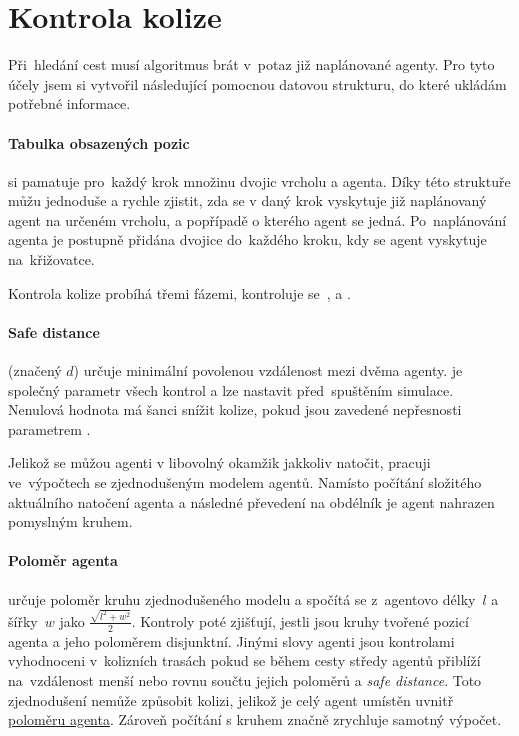 \section{Kontrola kolize}\label{sec:kolize}


Při~hledání cest musí algoritmus brát v~potaz již naplánované agenty.
Pro tyto účely jsem si vytvořil následující pomocnou datovou strukturu, do které ukládám potřebné informace.

\paragraph{Tabulka obsazených pozic}\label{par:obsazene_pozice} si pamatuje pro~každý krok množinu dvojic vrcholu a agenta.
Díky této struktuře můžu jednoduše a rychle zjistit,
zda se v daný krok vyskytuje již naplánovaný agent na určeném vrcholu, a popřípadě o kterého agent se jedná.
Po~naplánování agenta je postupně přidána dvojice do~každého kroku, kdy se agent vyskytuje na~křižovatce.

Kontrola kolize probíhá třemi fázemi, kontroluje se~,
 a .

\paragraph{Safe distance}\label{par:safe_distance} (značený $d$) určuje minimální povolenou vzdálenost mezi dvěma agenty.
 je společný parametr všech kontrol a lze nastavit před~spuštěním simulace.
Nenulová hodnota  má šanci snížit kolize,
pokud jsou zavedené nepřesnosti parametrem .

Jelikož se můžou agenti v libovolný okamžik jakkoliv natočit, pracuji ve~výpočtech se zjednodušeným modelem agentů.
Namísto počítání složitého aktuálního natočení agenta a následné převedení na obdélník je agent nahrazen pomyslným kruhem.

\paragraph{Poloměr agenta}\label{par:polomer_agenta} určuje poloměr kruhu zjednodušeného modelu
a spočítá se z~agentovo délky~$l$ a šířky~$w$ jako $\frac{\sqrt {l^2 + w^2}}{2}$.
Kontroly poté zjišťují, jestli jsou kruhy tvořené pozicí agenta a jeho poloměrem disjunktní.
Jinými slovy agenti jsou kontrolami vyhodnoceni v~kolizních trasách
pokud se během cesty středy agentů přiblíží na~vzdálenost menší nebo rovnu součtu jejich poloměrů a \emph{safe distance}.
Toto zjednodušení nemůže způsobit kolizi, jelikož je celý agent umístěn uvnitř \hyperref[par:polomer_agenta]{poloměru agenta}.
Zároveň počítání s kruhem značně zrychluje samotný výpočet.

